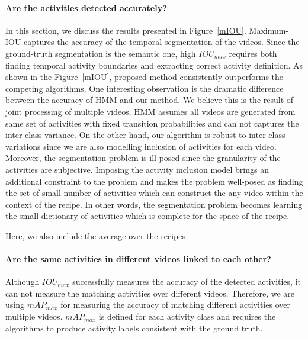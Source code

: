 \paragraph{Are the activities detected accurately?}
In this section, we discuss the results presented in Figure~\ref{mIOU}. Maximum-IOU captures the accuracy of the temporal segmentation of the videos. Since the ground-truth segmentation is the semantic one, high $IOU_{max}$ requires both finding temporal activity boundaries and extracting correct activity definition. As shown in the Figure~\ref{mIOU}, proposed method consistently outperforms the competing algorithms. One interesting observation is the dramatic difference between the accuracy of HMM and our method. We believe this is the result of joint processing of multiple videos. HMM assumes all videos are generated from same set of activities with fixed transition probabilities and can not captures the inter-class variance. On the other hand, our algorithm is robust to inter-class variations since we are also modelling inclusion of activities for each video. Moreover, the segmentation problem is ill-posed since the granularity of the activities are subjective. Imposing the activity inclusion model brings an additional constraint to the problem and makes the problem well-posed as finding the set of small number of activities which can construct the any video within the context of the recipe. In other words, the segmentation problem becomes learning the small dictionary of activities which is complete for the space of the recipe.

Here, we also include the average over the recipes
\begin{table}
\caption{Average of $IOU_{max}$ and $mAP_{max}$ over recipes.}
{\small
{}}
\normalsize
\end{table}

\paragraph{Are the same activities in different videos linked to each other?}
Although $IOU_{max}$ successfully measures the accuracy of the detected activities, it can not measure the matching activities over different videos. Therefore, we are using $mAP_{max}$ for measuring the accuracy of matching different activities over multiple videos. $mAP_{max}$ is defined for each activity class and requires the algorithms to produce activity labels consistent with the ground truth. 

